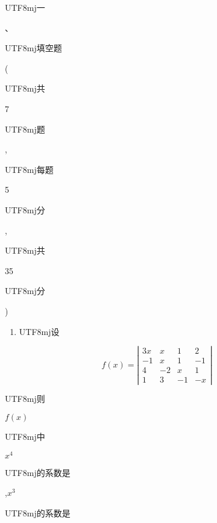 \documentclass[10pt]{article}
\begin{document}
\begin{CJK}{UTF8}{mj}一\end{CJK}、\begin{CJK}{UTF8}{mj}填空题\end{CJK} (\begin{CJK}{UTF8}{mj}共\end{CJK} 7 \begin{CJK}{UTF8}{mj}题\end{CJK}, \begin{CJK}{UTF8}{mj}每题\end{CJK} 5 \begin{CJK}{UTF8}{mj}分\end{CJK}, \begin{CJK}{UTF8}{mj}共\end{CJK} 35 \begin{CJK}{UTF8}{mj}分\end{CJK})

\begin{enumerate}
  \item \begin{CJK}{UTF8}{mj}设\end{CJK}
\end{enumerate}
$$
f(x)=\left|\begin{array}{cccc}
3 x & x & 1 & 2 \\
-1 & x & 1 & -1 \\
4 & -2 & x & 1 \\
1 & 3 & -1 & -x
\end{array}\right|
$$
\begin{CJK}{UTF8}{mj}则\end{CJK} $f(x)$ \begin{CJK}{UTF8}{mj}中\end{CJK} $x^{4}$ \begin{CJK}{UTF8}{mj}的系数是\end{CJK} ,$x^{3}$ \begin{CJK}{UTF8}{mj}的系数是\end{CJK}
\end{document}
